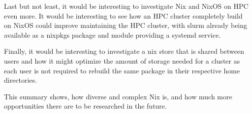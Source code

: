 \documentclass{eceasst}
\begin{document}
Last but not least, it would be interesting to investigate Nix and NixOS on HPC even more.
It would be interesting to see how an HPC cluster completely build on NixOS could improve maintaining the HPC cluster, with slurm already being available as a nixpkgs package and module providing a systemd service.

Finally, it would be interesting to investigate a nix store that is shared between users and how it might optimize the amount of storage needed for a cluster as each user is not required to rebuild the same package in their respective home directories.

This summary shows, how diverse and complex Nix is, and how much more opportunities there are to be researched in the future.



\nocite{*}


\end{document}

